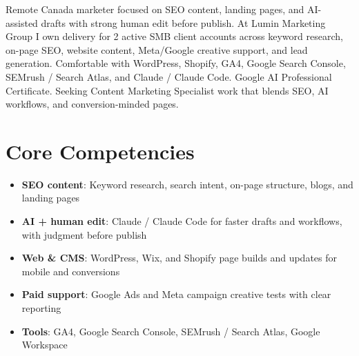 \documentclass[11pt,a4paper,sans]{moderncv}
\begin{document}
\makecvtitle

\vspace{6pt}
\small{Remote Canada marketer focused on SEO content, landing pages, and AI-assisted drafts with strong human edit before publish. At Lumin Marketing Group I own delivery for 2 active SMB client accounts across keyword research, on-page SEO, website content, Meta/Google creative support, and lead generation. Comfortable with WordPress, Shopify, GA4, Google Search Console, SEMrush / Search Atlas, and Claude / Claude Code. Google AI Professional Certificate. Seeking Content Marketing Specialist work that blends SEO, AI workflows, and conversion-minded pages.}

\section{Core Competencies}
\vspace{1pt}
\begin{itemize}
\item \textbf{SEO content}: Keyword research, search intent, on-page structure, blogs, and landing pages
\item \textbf{AI + human edit}: Claude / Claude Code for faster drafts and workflows, with judgment before publish
\item \textbf{Web \& CMS}: WordPress, Wix, and Shopify page builds and updates for mobile and conversions
\item \textbf{Paid support}: Google Ads and Meta campaign creative tests with clear reporting
\item \textbf{Tools}: GA4, Google Search Console, SEMrush / Search Atlas, Google Workspace
\end{itemize}
\end{document}
